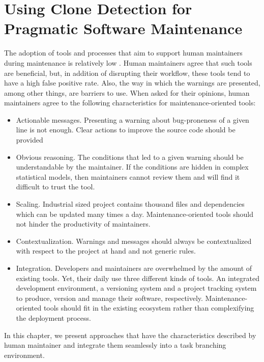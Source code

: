 \chapter{Using Clone Detection for Pragmatic Software Maintenance\label{chap:clone-detection-pragmatic}}

The adoption of tools and processes that aim to support human maintainers during maintenance is relatively low \cite{Lewis2013,Foss2015,Layman2007,Ayewah2007,Ayewah2008,Johnson2013,Norman2013, Lopez2011}.
Human maintainers agree that such tools are beneficial, but, in addition of disrupting their workflow, these tools tend to have a high false positive rate.
Also, the way in which the warnings are presented, among other things, are barriers to use\cite{Johnson2013}.
When asked for their opinions, human maintainers agree to the following characteristics for maintenance-oriented tools\cite{Hovemeyer2004, Lopez2011, Lewis2013}:

\begin{itemize}
	\item Actionable messages. Presenting a warning about bug-proneness of a given line is not enough.
	Clear actions to improve the source code should be provided
	\item Obvious reasoning. The conditions that led to a given warning should be understandable by the maintainer.
	If the conditions are hidden in complex statistical models, then maintainers cannot review them and will find it difficult to trust the tool.
	\item Scaling. Industrial sized project contains thousand files and dependencies which can be updated many times a day.
	Maintenance-oriented tools should not hinder the productivity of maintainers.
	\item Contextualization. Warnings and messages should always be contextualized with respect to the project at hand and not generic rules.
	\item Integration. Developers and maintainers are overwhelmed by the amount of existing tools.
	Yet, their daily use three different kinds of tools.
	An integrated development environment, a versioning system and a project tracking system to produce, version and manage their software, respectively.
	Maintenance-oriented tools should fit in the existing ecosystem rather than complexifying the deployment process.
\end{itemize}

In this chapter, we present approaches that have the characteristics described by human maintainer and integrate them seamlessly into a task branching environment.

